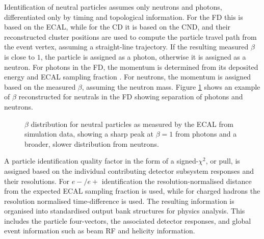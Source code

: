     Identification of neutral particles assumes only neutrons and photons, differentiated only by timing and topological information.
    For the FD this is based on the ECAL, while for the CD it is based on the CND, and their reconstructed cluster positions are used to compute the particle travel path from the event vertex, assuming a straight-line trajectory.
    If the resulting measured $\beta$ is close to $1$, the particle is assigned as a photon, otherwise it is assigned as a neutron.
    For photons in the FD, the momentum is determined from its deposited energy and ECAL sampling fraction \cite{asryan2020}.
    For neutrons, the momentum is assigned based on the measured $\beta$, assuming the neutron mass.
    Figure \ref{fig::n_gamma} shows an example of $\beta$ reconstructed for neutrals in the FD showing separation of photons and neutrons.

    \begin{figure}
        \centering{}
        \caption[$\beta$ distribution of neutrals.]{$\beta$ distribution for neutral particles as measured by the ECAL from simulation data, showing a sharp peak at $\beta = 1$ from photons and a broader, slower distribution from neutrons.
        }
        \label{fig::n_gamma}
    \end{figure}

    A particle identification quality factor in the form of a signed-$\chi^2$, or pull, is assigned based on the individual contributing detector subsystem responses and their resolutions.
    For $e-/e+$ identification the resolution-normalised distance from the expected ECAL sampling fraction is used, while for charged hadrons the resolution normalised time-difference is used.
    The resulting information is organised into standardised output bank structures for physics analysis.
    This includes the particle four-vectors, the associated detector responses, and global event information such as beam RF and helicity information.

